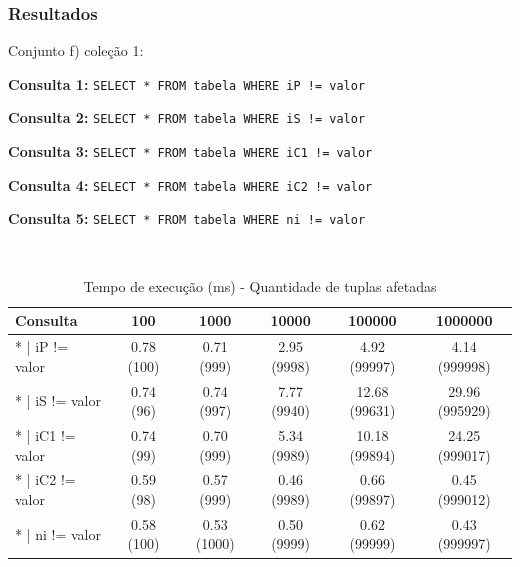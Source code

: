 \documentclass[10pt]{beamer}
\begin{document}
\begin{frame}[fragile]
  \frametitle{Resultados}


  \begin{itemize}
  \item Conjunto f) coleção 1:

  \footnotesize{\item \textbf{Consulta 1: } \texttt{SELECT * FROM tabela WHERE iP != valor}}

  \item  \footnotesize{\textbf{Consulta 2: } \texttt{SELECT * FROM tabela WHERE iS != valor}}

   \item \footnotesize{\textbf{Consulta 3: } \texttt{SELECT * FROM tabela WHERE iC1 != valor}}
  
   \item \footnotesize{\textbf{Consulta 4: } \texttt{SELECT * FROM tabela WHERE iC2 != valor}}
  
   \item \footnotesize{\textbf{Consulta 5: } \texttt{SELECT * FROM tabela WHERE ni != valor}}

   \item[\ ] \

  \end{itemize}

\begin{adjustwidth}{-2em}{-2em}


 \begin{table}[!htb]
    \footnotesize
    \centering
    \begin{tabular}{lccccc}
      \toprule
      \textbf{Consulta} & \textbf{100}  & \textbf{1000}  & \textbf{10000} & \textbf{100000} & \textbf{1000000}  \\
      \midrule
      * | iP != valor  & 0.78 (100)  &  0.71 (999)  & 2.95 (9998)  & 4.92 (99997) & 4.14 (999998)  \\
      * | iS != valor  & 0.74 (96)  &  0.74 (997)  & 7.77 (9940)  & 12.68 (99631) & 29.96 (995929)  \\
      * | iC1 != valor & 0.74 (99)  &  0.70 (999) & 5.34 (9989)  & 10.18 (99894) & 24.25 (999017)  \\
      * | iC2 != valor & 0.59 (98)  &  0.57 (999)  & 0.46 (9989)  & 0.66 (99897) & 0.45 (999012)  \\
      * | ni != valor  & 0.58 (100)  &  0.53 (1000) & 0.50 (9999)  & 0.62 (99999) & 0.43 (999997)  \\
      \bottomrule
    \end{tabular}
    \caption{Tempo de execução (ms) - Quantidade de tuplas afetadas} 
    \end{table}

\end{adjustwidth}
\end{frame}
\end{document}
